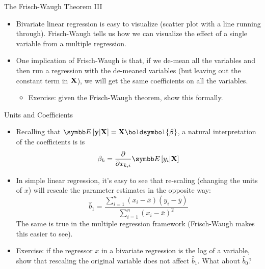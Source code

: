 \documentclass[aspectratio=169,11pt]{beamer}
\begin{document}
\begin{frame}{The Frisch-Waugh Theorem III}
\begin{itemize}
	\item Bivariate linear regression is easy to visualize (scatter plot with a line running through).
	Frisch-Waugh tells us how we can visualize the effect of a single variable from a multiple
	regression.

	\medskip
	\item One implication of Frisch-Waugh is that, if we de-mean all the variables and then 
	run a regression with the de-meaned variables (but leaving out the constant term in ${\bf X}$),
	we will get the same coefficients on all the variables.
	\begin{itemize}
		\item Exercise: given the Frisch-Waugh theorem, show this formally. 
	\end{itemize}
\end{itemize}
\end{frame}



\begin{frame}{Units and Coefficients}
\begin{itemize}
	\item Recalling that $\E\left[{\bf y}|{\bf X}\right] = {\bf X} \boldsymbol{\beta}$, a natural interpretation	of
	the coefficients is 
	is \[
	\beta_k = \frac{\partial }{\partial x_{k,i}}\E\left[y_i |{\bf X}\right]
	\]
	
	\item In simple linear regression, it's easy to see that re-scaling (changing the units
	of $x$) will rescale the parameter estimates in the opposite way:\[
		\hat{b}_1 =\frac{\sum\limits_{i=1}^n(x_i-\bar{x})(y_i-\bar{y})}{\sum\limits_{i=1}^n(x_i-\bar{x})^2}
	\]
 	The same is true in the multiple regression framework (Frisch-Waugh makes this easier to see). 

	\medskip
	\item Exercise: if the regressor $x$ in a bivariate regression
	is the log of a variable, show that rescaling the original variable does not
	affect $\hat{b}_1 $. What about $\hat{b}_0$? 
\end{itemize}
\end{frame}
\end{document}
